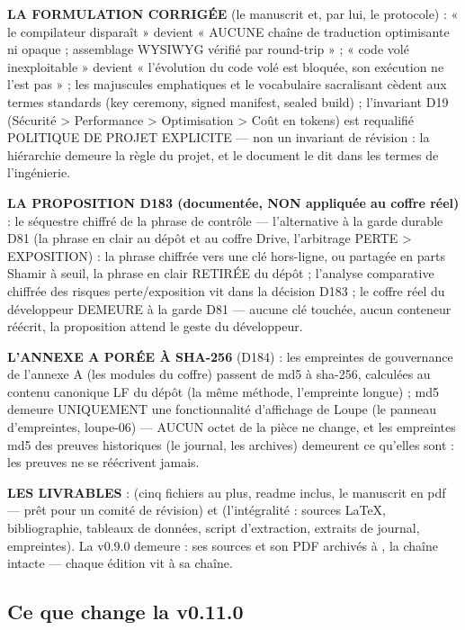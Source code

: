 \textbf{LA FORMULATION CORRIGÉE} (le manuscrit et, par lui, le protocole) :
« le compilateur disparaît » devient « AUCUNE chaîne de traduction
optimisante ni opaque ; assemblage WYSIWYG vérifié par round-trip » ;
« code volé inexploitable » devient « l'évolution du code volé est
bloquée, son exécution ne l'est pas » ; les majuscules emphatiques et le
vocabulaire sacralisant cèdent aux termes standards (key ceremony, signed
manifest, sealed build) ; l'invariant D19 (Sécurité > Performance >
Optimisation > Coût en tokens) est requalifié POLITIQUE DE PROJET
EXPLICITE — non un invariant de révision : la hiérarchie demeure la règle
du projet, et le document le dit dans les termes de l'ingénierie.

\textbf{LA PROPOSITION D183 (documentée, NON appliquée au coffre réel)} :
le séquestre chiffré de la phrase de contrôle — l'alternative à la garde
durable D81 (la phrase en clair au dépôt et au coffre Drive, l'arbitrage
PERTE > EXPOSITION) : la phrase chiffrée vers une clé hors-ligne, ou
partagée en parts Shamir à seuil, la phrase en clair RETIRÉE du dépôt ;
l'analyse comparative chiffrée des risques perte/exposition vit dans la
décision D183 ; le coffre réel du développeur DEMEURE à la garde D81 —
aucune clé touchée, aucun conteneur réécrit, la proposition attend le
geste du développeur.

\textbf{L'ANNEXE A PORÉE À SHA-256} (D184) : les empreintes de gouvernance
de l'annexe A (les modules du coffre) passent de md5 à sha-256, calculées
au contenu canonique LF du dépôt (la même méthode, l'empreinte longue) ;
md5 demeure UNIQUEMENT une fonctionnalité d'affichage de Loupe (le panneau
d'empreintes, loupe-06) — AUCUN octet de la pièce ne change, et les
empreintes md5 des preuves historiques (le journal, les archives) demeurent
ce qu'elles sont : les preuves ne se réécrivent jamais.

\textbf{LES LIVRABLES} :  (cinq
fichiers au plus, readme inclus, le manuscrit en pdf — prêt pour un comité
de révision) et  (l'intégralité :
sources LaTeX, bibliographie, tableaux de données, script d'extraction,
extraits de journal, empreintes). La v0.9.0 demeure : ses sources et son
PDF archivés à , la chaîne  intacte — chaque
édition vit à sa chaîne.

\subsection{Ce que change la v0.11.0}\label{sec:nouveautes110}

